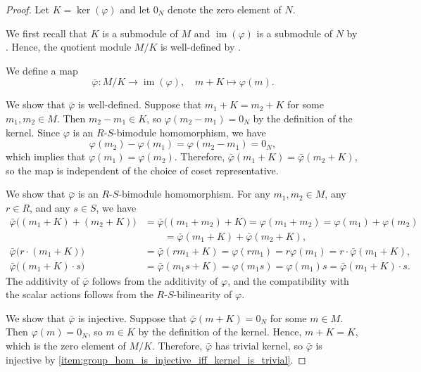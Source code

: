 \begin{proof}
    Let $K = \ker(\varphi)$ and let $0_N$ denote the zero element of $N$.

    We first recall that $K$ is a submodule of $M$ and $\operatorname{im}(\varphi)$ is a submodule of $N$ by . Hence, the quotient module $M/K$ is well-defined by .

    We define a map
    $$\bar{\varphi} : M/K \longrightarrow \operatorname{im}(\varphi), \quad m + K \longmapsto \varphi(m).$$

    We show that $\bar{\varphi}$ is well-defined. Suppose that $m_1 + K = m_2 + K$ for some $m_1, m_2 \in M$. Then $m_2 - m_1 \in K$, so $\varphi(m_2 - m_1) = 0_N$ by the definition of the kernel. Since $\varphi$ is an $R$-$S$-bimodule homomorphism, we have
    $$\varphi(m_2) - \varphi(m_1) = \varphi(m_2 - m_1) = 0_N,$$
    which implies that $\varphi(m_1) = \varphi(m_2)$. Therefore, $\bar{\varphi}(m_1 + K) = \bar{\varphi}(m_2 + K)$, so the map is independent of the choice of coset representative.

    We show that $\bar{\varphi}$ is an $R$-$S$-bimodule homomorphism. For any $m_1, m_2 \in M$, any $r \in R$, and any $s \in S$, we have
    \begin{align*}
    \bar{\varphi}\bigl((m_1 + K) + (m_2 + K)\bigr) &= \bar{\varphi}\bigl((m_1 + m_2) + K\bigr) = \varphi(m_1 + m_2) = \varphi(m_1) + \varphi(m_2) \\
    &\qquad = \bar{\varphi}(m_1 + K) + \bar{\varphi}(m_2 + K), \\
    \bar{\varphi}\bigl(r \cdot (m_1 + K)\bigr) &= \bar{\varphi}(r m_1 + K) = \varphi(r m_1) = r \varphi(m_1) = r \cdot \bar{\varphi}(m_1 + K), \\
    \bar{\varphi}\bigl((m_1 + K) \cdot s\bigr) &= \bar{\varphi}(m_1 s + K) = \varphi(m_1 s) = \varphi(m_1) s = \bar{\varphi}(m_1 + K) \cdot s.
    \end{align*}
    The additivity of $\bar{\varphi}$ follows from the additivity of $\varphi$, and the compatibility with the scalar actions follows from the $R$-$S$-bilinearity of $\varphi$.

    We show that $\bar{\varphi}$ is injective. Suppose that $\bar{\varphi}(m + K) = 0_N$ for some $m \in M$. Then $\varphi(m) = 0_N$, so $m \in K$ by the definition of the kernel. Hence, $m + K = K$, which is the zero element of $M/K$. Therefore, $\bar{\varphi}$ has trivial kernel, so $\bar{\varphi}$ is injective by \eqref{item:group_hom_is_injective_iff_kernel_is_trivial}.


\end{proof}
